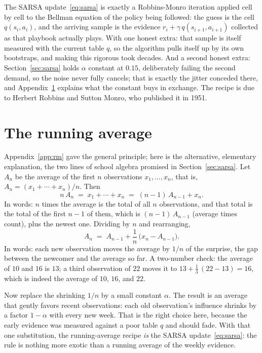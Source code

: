 \documentclass[11pt,a4paper]{article}
\theoremstyle{definition}
\theoremstyle{remark}
\numberwithin{equation}{section}
\begin{document}
The SARSA update~\eqref{eq:sarsa} is exactly a Robbins-Monro iteration applied cell by
cell to the Bellman equation of the policy being followed: the guess is the cell
$q(s_i, a_i)$, and the arriving sample is the evidence $r_i + \gamma\, q(s_{i+1}, a_{i+1})$
collected as that playbook actually plays. With one honest extra: that sample is itself
measured with the current table $q$, so the algorithm pulls itself up by its own
bootstraps, and making this rigorous took decades. And a second honest extra:
Section~\ref{sec:sarsa} holds $\alpha$ constant at $0.15$, deliberately failing the second
demand, so the noise never fully cancels; that is exactly the jitter conceded there, and
Appendix~\ref{app:runavg} explains what the constant buys in exchange. The recipe is due to
Herbert Robbins and Sutton Monro, who published it in 1951.

\section{The running average}\label{app:runavg}

Appendix~\ref{app:rm} gave the general principle; here is the alternative, elementary
explanation, the two lines of school algebra promised in
Section~\ref{sec:sarsa}. Let $A_n$ be the average of the first
$n$ observations $x_1, \dots, x_n$, that is, $A_n = (x_1 + \cdots + x_n)/n$. Then
\[
n\,A_n \;=\; x_1 + \cdots + x_n \;=\; (n-1)\,A_{n-1} + x_n.
\]
In words: $n$ times the average is the total of all $n$ observations, and that total is
the total of the first $n-1$ of them, which is $(n-1)\,A_{n-1}$ (average times count),
plus the newest one. Dividing by $n$ and rearranging,
\[
A_n \;=\; A_{n-1} + \frac{1}{n}\,\bigl(x_n - A_{n-1}\bigr).
\]
In words: each new observation moves the average by $1/n$ of the surprise, the gap between
the newcomer and the average so far. A two-number check: the average of $10$ and $16$ is
$13$; a third observation of $22$ moves it to $13 + \tfrac{1}{3}\,(22 - 13) = 16$, which
is indeed the average of $10$, $16$, and $22$.

Now replace the shrinking $1/n$ by a small constant $\alpha$. The result is an average
that gently favors recent observations: each old observation's influence shrinks by a
factor $1 - \alpha$ with every new week. That is the right choice here, because the early
evidence was measured against a poor table $q$ and should fade. With that one
substitution, the running-average recipe \emph{is} the SARSA update~\eqref{eq:sarsa}: the
rule is nothing more exotic than a running average of the weekly evidence.
\end{document}
